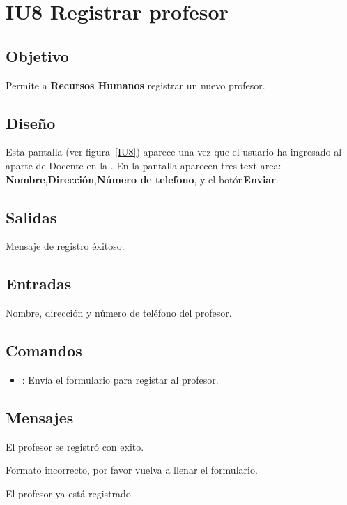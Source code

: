 \newpage
\section{IU8 Registrar profesor}

\subsection{Objetivo}
	Permite a {\bf Recursos Humanos} registrar un nuevo profesor.

\subsection{Diseño}
	Esta pantalla  (ver figura~\ref{IU8}) aparece una vez que el usuario ha ingresado al aparte de Docente en la . 
    En la pantalla aparecen tres text area: {\bf Nombre},{\bf Dirección},{\bf Número de telefono}, y el botón{\bf Enviar}. 

 

\subsection{Salidas}

	Mensaje de registro éxitoso.

\subsection{Entradas}
Nombre, dirección y número de teléfono del profesor.

\subsection{Comandos}
\begin{itemize}
	\item {}: Envía el formulario para registar al profesor. 
\end{itemize}

\subsection{Mensajes}
\begin{Citemize}
	\item El profesor se registró con exito.
        \item Formato incorrecto, por favor vuelva a llenar el formulario.
        \item El profesor ya está registrado.
\end{Citemize}

